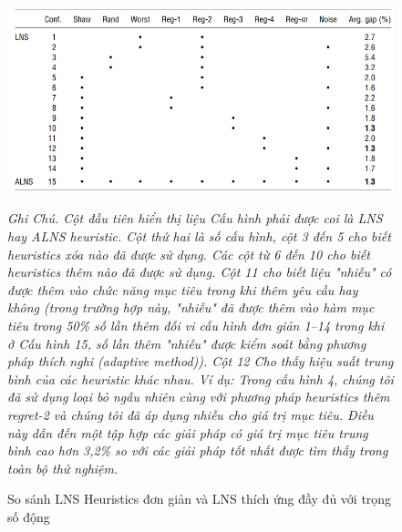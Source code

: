 \begin{center}
    \begin{figure}[]
    \caption{So sánh LNS Heuristics đơn giản và LNS thích ứng đầy đủ với trọng số động}        
    \begin{center}
     \includegraphics[scale=.5]{figures/Thuy_table4}
    \end{center}
  \textit{Ghi Chú. Cột đầu tiên hiển thị liệu Cấu hình phải được coi là LNS hay ALNS heuristic. Cột thứ hai là số cấu hình, cột 3 đến 5 cho biết heuristics xóa nào đã được sử dụng. Các cột từ 6 đến 10 cho biết heuristics thêm nào đã được sử dụng. Cột 11 cho biết liệu "nhiễu" có được thêm vào chức năng mục tiêu trong khi thêm yêu cầu hay không (trong trường hợp này, "nhiễu" đã được thêm vào hàm mục tiêu trong 50\% số lần thêm đối vi cấu hình đơn giản 1–14 trong khi ở Cấu hình 15, số lần thêm "nhiễu" được kiểm soát bằng phương pháp thích nghi (adaptive method)). Cột 12 Cho thấy hiệu suất trung bình của các heuristic khác nhau. Ví dụ: Trong cấu hình 4, chúng tôi đã sử dụng loại bỏ ngẫu nhiên cùng với phương pháp heuristics thêm regret-2 và chúng tôi đã áp dụng nhiễu cho giá trị mục tiêu. Điều này dẫn đến một tập hợp các giải pháp có giá trị mục tiêu trung bình cao hơn 3,2\% so với các giải pháp tốt nhất được tìm thấy trong toàn bộ thử nghiệm.}
    \end{figure}
\end{center}

